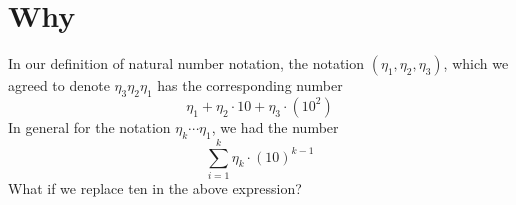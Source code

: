 
\section*{Why}

In our definition of natural number notation, the notation $(\eta _1, \eta _2, \eta _3)$, which we agreed to denote $\eta _3\eta _2\eta _1$ has the corresponding number
\[
\eta _1 + \eta _2\cdot 10 + \eta _3\cdot (10^2)
\]
In general for the notation $\eta _k\cdots\eta _1$, we had the number
\[
\sum_{i = 1}^{k} \eta _k \cdot  (10)^{k-1}
\]
What if we replace ten in the above expression?


\blankpage